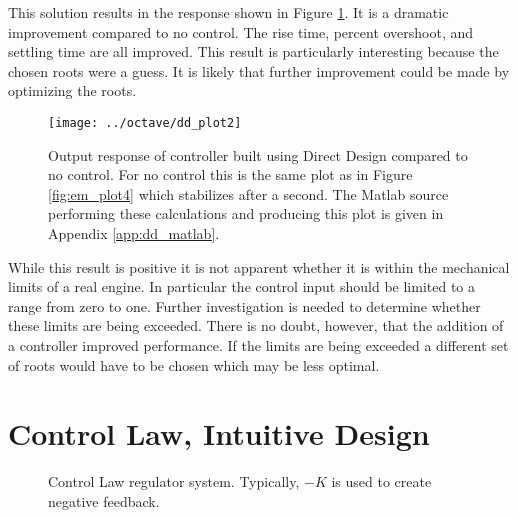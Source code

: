 \documentclass{article}
\begin{document}
This solution results in the response shown in Figure \ref{fig:dd_plot2}.
It is a dramatic improvement compared to no control.
The rise time, percent overshoot, and settling time are all improved.
This result is particularly interesting because the chosen roots were a guess.
It is likely that further improvement could be made by optimizing the roots.

\begin{figure}[htbp!]
\begin{center}
\texttt{[image: ../octave/dd\_plot2]}
\end{center}
\caption{Output response of controller built using Direct Design
compared to no control.  For no control this is the same plot
as in Figure \ref{fig:em_plot4} which stabilizes after a second.
The Matlab source performing these calculations and producing this
plot is given in Appendix \ref{app:dd_matlab}.}
\label{fig:dd_plot2}
\end{figure}

While this result is positive it is not apparent whether it is within
the mechanical limits of a real engine.
In particular the control input should be limited to a range from zero to one.
Further investigation is needed to determine whether these limits
are being exceeded.
There is no doubt, however, that the addition of a controller
improved performance.
If the limits are being exceeded a different set of roots would have to
be chosen which may be less optimal.


\clearpage
\section{Control Law, Intuitive Design}

\begin{figure}[hpb!]
\begin{center}


\end{center}

\caption{Control Law regulator system.
Typically, $-K$ is used to create negative feedback.}
\label{fig:clid01}
\end{figure}
\end{document}
